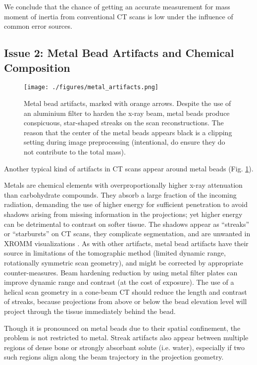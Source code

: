 We conclude that the chance of getting an accurate measurement for mass moment of inertia from conventional CT scans is low under the influence of common error sources.



\subsection{Issue 2: Metal Bead Artifacts and Chemical Composition}
\label{sec:org4c63515}

\begin{figure}[p]
\centering
\texttt{[image: ./figures/metal\_artifacts.png]}
\caption{\label{fig:metal_artifacts}Metal bead artifacts, marked with orange arrows. Despite the use of an aluminium filter to harden the x-ray beam, metal beads produce conspicuous, star-shaped streaks on the scan reconstructions. The reason that the center of the metal beads appears black is a clipping setting during image preprocessing (intentional, do ensure they do not contribute to the total mass).}
\end{figure}

Another typical kind of artifacts in CT scans appear around metal beads (Fig. \ref{fig:metal_artifacts}).

Metals are chemical elements with overproportionally higher x-ray attenuation than carbohydrate compounds.
They absorb a large fraction of the incoming radiation, demanding the use of higher energy for sufficient penetration to avoid shadows arising from missing information in the projections; yet higher energy can be detrimental to contrast on softer tissue.
The shadows appear as ``streaks'' or ``starbursts'' on CT scans, they complicate segmentation, and are unwanted in XROMM visualizations \citep{Brainerd2010}.
As with other artifacts, metal bead artifacts have their source in limitations of the tomographic method (limited dynamic range, rotationally symmetric scan geometry), and might be corrected by appropriate counter-measures.
Beam hardening reduction by using metal filter plates can improve dynamic range and contrast (at the cost of exposure).
The use of a helical scan geometry in a cone-beam CT should reduce the length and contrast of streaks, because projections from above or below the bead elevation level will project through the tissue immediately behind the bead.

Though it is pronounced on metal beads due to their spatial confinement, the problem is not restricted to metal.
Streak artifacts also appear between multiple regions of dense bone or strongly absorbant solute (i.e. water), especially if two such regions align along the beam trajectory in the projection geometry.


